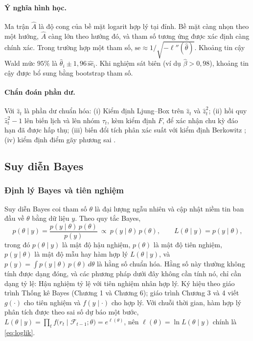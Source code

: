 \documentclass[12pt,a4paper]{article}
\theoremstyle{definition}
\theoremstyle{remark}
\newcommand{\Fcal}{\mathcal{F}}
\begin{document}
\paragraph{Ý nghĩa hình học.} Ma trận $\hat A$ là độ cong của bề mặt logarit hợp lý tại đỉnh. Bề mặt càng nhọn theo một hướng, $\hat A$ càng lớn theo hướng đó, và tham số tương ứng được xác định càng chính xác. Trong trường hợp một tham số, $\mathrm{se}\approx1/\sqrt{-\ell''(\hat\theta)}$. Khoảng tin cậy Wald mức $95\%$ là $\hat\theta_i\pm1{,}96\,\widehat{\mathrm{se}}_i$. Khi nghiệm sát biên (ví dụ $\hat\beta>0{,}98$), khoảng tin cậy được bổ sung bằng bootstrap tham số.

\paragraph{Chẩn đoán phần dư.} Với $\hat z_t$ là phần dư chuẩn hóa: (i) Kiểm định Ljung--Box trên $\hat z_t$ và $\hat z_t^2$; (ii) hồi quy $\hat z_t^2-1$ lên biến lịch và lên nhóm $\tau_t$, kèm kiểm định $F$, để xác nhận chu kỳ đáo hạn đã được hấp thụ; (iii) biến đổi tích phân xác suất với kiểm định Berkowitz \cite{berkowitz2001}; (iv) kiểm định điểm gãy phương sai \cite{inclan1994}.

\subsection{Suy diễn Bayes}

\subsubsection{Định lý Bayes và tiên nghiệm}

Suy diễn Bayes coi tham số $\theta$ là đại lượng ngẫu nhiên và cập nhật niềm tin ban đầu về $\theta$ bằng dữ liệu $y$. Theo quy tắc Bayes,
\begin{equation}\label{eq:bayes}
p(\theta\mid y)=\frac{p(y\mid\theta)\,p(\theta)}{p(y)}\ \propto\ p(y\mid\theta)\,p(\theta),\qquad L(\theta\mid y)=p(y\mid\theta),
\end{equation}
trong đó $p(\theta\mid y)$ là mật độ hậu nghiệm, $p(\theta)$ là mật độ tiên nghiệm, $p(y\mid\theta)$ là mật độ mẫu hay hàm hợp lý $L(\theta\mid y)$, và $p(y)=\int p(y\mid\theta)\,p(\theta)\,d\theta$ là hằng số chuẩn hóa. Hằng số này thường không tính được dạng đóng, và các phương pháp dưới đây không cần tính nó, chỉ cần dạng tỷ lệ: Hậu nghiệm tỷ lệ với tiên nghiệm nhân hợp lý. Ký hiệu theo giáo trình Thống kê Bayes (Chương 1 và Chương 6); giáo trình Chương 3 và 4 viết $g(\cdot)$ cho tiên nghiệm và $f(y\mid\cdot)$ cho hợp lý. Với chuỗi thời gian, hàm hợp lý phân tích được theo sai số dự báo một bước, $L(\theta\mid y)=\prod_t f\big(r_t\mid\Fcal_{t-1};\theta\big)=e^{\ell(\theta)}$, nên $\ell(\theta)=\ln L(\theta\mid y)$ chính là \eqref{eq:loglik}.
\end{document}
